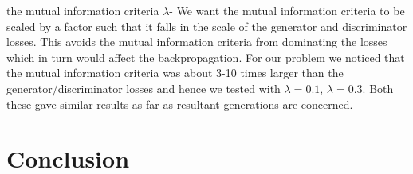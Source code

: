 \documentclass{article}
\begin{document}
\begin{itemize}
the mutual information criteria $\lambda$- We want the
        mutual information criteria to be scaled by a factor such that it falls
        in the scale of the generator and discriminator losses. This avoids the
        mutual information criteria from dominating the losses which in turn
        would affect the backpropagation. For our problem we noticed that the
        mutual information criteria was about 3-10 times larger than the
        generator/discriminator losses and hence we tested with $\lambda = 0.1$,
        $\lambda = 0.3$. Both these gave similar results as far as resultant
        generations are concerned.
\end{itemize}
\section{Conclusion}

\printbibliography
\end{document}
